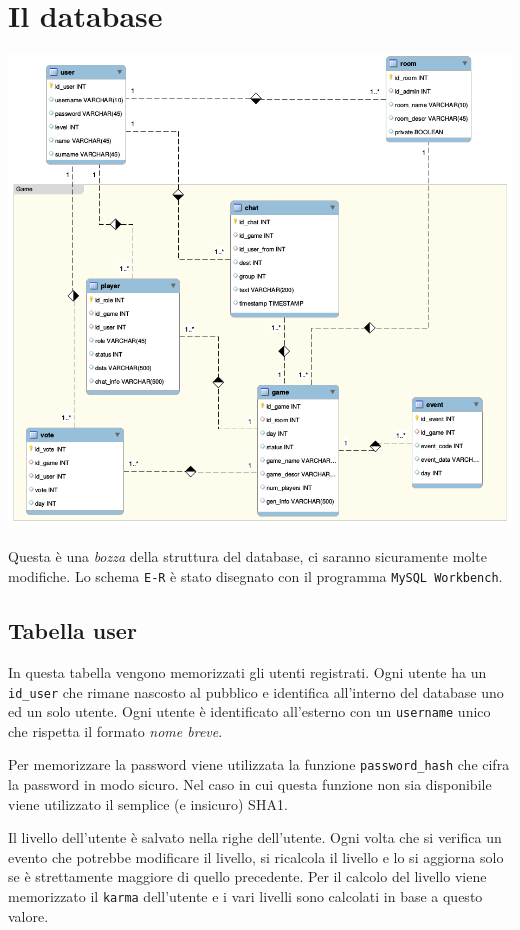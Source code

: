 \documentclass[10pt,a4paper]{article}
\begin{document}
\section{Il database}
\includegraphics[width = \textwidth]{database.png}

Questa è una \emph{bozza} della struttura del database, ci saranno sicuramente molte modifiche. Lo schema \texttt{E-R} è stato disegnato con il programma \texttt{MySQL Workbench}.

\subsection{Tabella user}
In questa tabella vengono memorizzati gli utenti registrati. Ogni utente ha un \texttt{id\_user} che rimane nascosto al pubblico e identifica all'interno del database uno ed un solo utente. Ogni utente è identificato all'esterno con un \texttt{username} unico che rispetta il formato \emph{nome breve}.

Per memorizzare la password viene utilizzata la funzione \texttt{password\_hash} che cifra la password in modo sicuro. Nel caso in cui questa funzione non sia disponibile viene utilizzato il semplice (e insicuro) SHA1.

Il livello dell'utente è salvato nella righe dell'utente. Ogni volta che si verifica un evento che potrebbe modificare il livello, si ricalcola il livello e lo si aggiorna solo se è strettamente maggiore di quello precedente. Per il calcolo del livello viene memorizzato il \texttt{karma} dell'utente e i vari livelli sono calcolati in base a questo valore.
\end{document}
